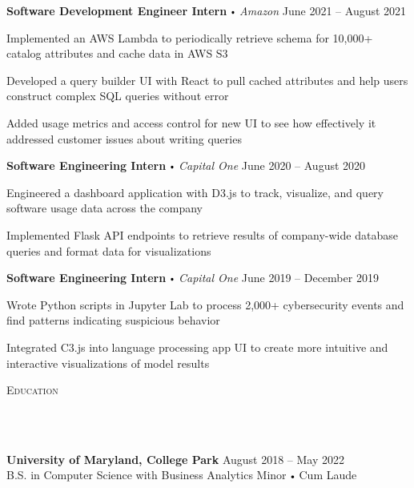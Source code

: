 \documentclass{article}
\newcommand{\header}[1]{{
\hspace*{-15pt}\vspace*{10pt} \large \scshape{#1}} \vspace*{-6pt} 
\lineunder
}
\newcommand{\lineunder}{
\vspace*{-8pt} \\ \hspace*{-18pt} 
\hrulefill \\
}
\newcommand{\school}[4]{
\textbf{#1} #2 \hfill #3 \\ #4 \vspace*{5pt}
}
\newcommand{\employer}[4]{
\textbf{#1} \labelitemi \textit{#2} \hfill #3 \\ #4 \vspace*{3pt}
}
\renewcommand{\labelitemi}{
$\vcenter{\hbox{\tiny$\bullet$}}$\hspace*{3pt}
}
\renewcommand{\labelitemii}{
$\vcenter{\hbox{\tiny$\bullet$}}$\hspace*{-3pt}
}
\newenvironment{bullet-list-minor}{
\begin{list}{\labelitemii}{\setlength\leftmargin{15pt} 
\topsep 0pt \itemsep 1pt}}{\vspace*{4pt}\end{list}
}
\begin{document}
     \employer{Software Development Engineer Intern}{Amazon}{June  2021 -- August 2021}{}
	\begin{bullet-list-minor}
	\item Implemented an AWS Lambda to periodically retrieve
	schema for 10,000+ catalog attributes and cache data in AWS S3
    \item Developed a query builder UI with React to pull cached attributes and help users construct complex SQL queries without error
    \item Added usage metrics and access control for new UI to see how effectively it addressed customer issues about writing queries
    \end{bullet-list-minor}
    \medskip
    
    \employer{Software Engineering Intern}{Capital One}{June 2020 -- August 2020}{}
	\begin{bullet-list-minor}
	\item Engineered a dashboard application with D3.js to track, visualize, and query software usage data across the company
	\item Implemented Flask API endpoints to retrieve results of company-wide database queries and format data for visualizations
    \end{bullet-list-minor}
    \medskip
    
    \employer{Software Engineering Intern}{Capital One}{June 2019 -- December 2019}{}
	\begin{bullet-list-minor}
	\item Wrote Python scripts in Jupyter Lab to process 2,000+  cybersecurity events and find patterns indicating suspicious behavior
	\item Integrated C3.js into language processing app UI to create more intuitive and interactive visualizations of model results
    \end{bullet-list-minor}
\medskip

\header{Education}
    \vspace{4pt}
    \school{University of Maryland, College Park}{}{August 2018 -- May 2022}{\vspace{4pt}  B.S. in Computer Science with Business Analytics Minor \labelitemi Cum Laude}


\medskip
\end{document}
